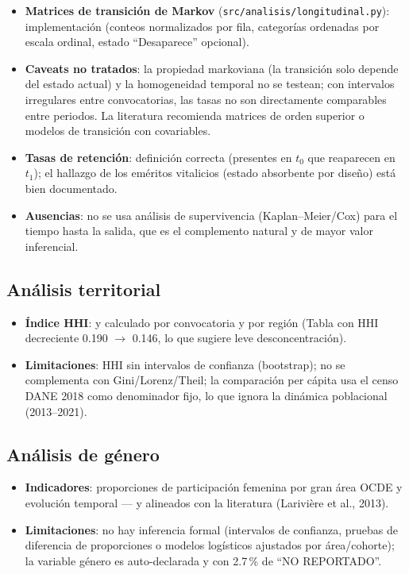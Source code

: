 \begin{itemize}
  \item \textbf{Matrices de transición de Markov} (\texttt{src/analisis/longitudinal.py}):
        implementación  (conteos normalizados por fila,
        categorías ordenadas por escala ordinal, estado ``Desaparece'' opcional).
  \item \textbf{Caveats no tratados}: la propiedad markoviana (la transición solo
        depende del estado actual) y la homogeneidad temporal no se testean; con
        intervalos irregulares entre convocatorias, las tasas no son directamente
        comparables entre periodos. La literatura recomienda matrices de orden
        superior o modelos de transición con covariables.
  \item \textbf{Tasas de retención}: definición correcta (presentes en $t_0$ que
        reaparecen en $t_1$); el hallazgo de los eméritos vitalicios (estado
        absorbente por diseño) está bien documentado.
  \item \textbf{Ausencias}: no se usa análisis de supervivencia (Kaplan--Meier/Cox)
        para el tiempo hasta la salida, que es el complemento natural y de mayor
        valor inferencial.
\end{itemize}

\subsection{Análisis territorial}

\begin{itemize}
  \item \textbf{Índice HHI}:  y calculado por
        convocatoria y por región (Tabla con HHI decreciente 0.190 $\rightarrow$ 0.146,
        lo que sugiere leve desconcentración).
  \item \textbf{Limitaciones}: HHI sin intervalos de confianza (bootstrap); no se
        complementa con Gini/Lorenz/Theil; la comparación per cápita usa el censo
        DANE 2018 como denominador fijo, lo que ignora la dinámica poblacional
        (2013--2021).
\end{itemize}

\subsection{Análisis de género}

\begin{itemize}
  \item \textbf{Indicadores}: proporciones de participación femenina por gran área
        OCDE y evolución temporal —  y alineados con la literatura
        (Larivière et al., 2013).
  \item \textbf{Limitaciones}: no hay inferencia formal (intervalos de confianza,
        pruebas de diferencia de proporciones o modelos logísticos ajustados por
        área/cohorte); la variable género es auto-declarada y con 2.7\,\% de
        ``NO REPORTADO''.
\end{itemize}

